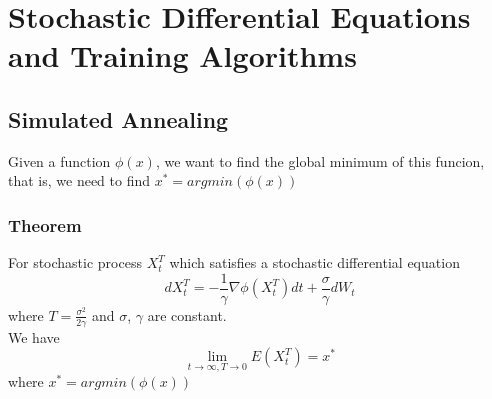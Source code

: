 \chapter{Stochastic Differential Equations and Training Algorithms}

\section{Simulated Annealing}
Given a function $\phi(x)$, we want to find the global minimum of this funcion, that is, we need to find $x^*=argmin(\phi(x))$
\subsection{Theorem}
For stochastic process $X^T_t$ which satisfies a stochastic differential equation 
$$dX_t^T=-\frac{1}{\gamma}\nabla\phi(X_t^T)dt+\frac{\sigma}{\gamma} dW_t$$
where $T=\frac{\sigma^2}{2\gamma}$ and $\sigma$, $\gamma$ are constant.
~\\We have 
$$\mathop{lim}\limits_{t\rightarrow\infty, T\rightarrow 0}E(X^T_t)=x^*$$
where $x^*=argmin (\phi(x))$
